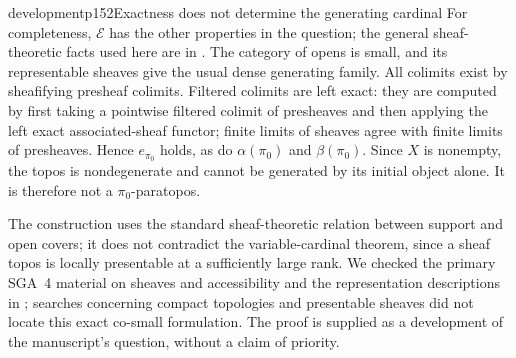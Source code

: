 \begin{dcomment}{development}{p152}{Exactness does not determine the generating cardinal}
For completeness, $\mathcal E$ has the other properties in the question; the general sheaf-theoretic facts used here are in \citet[Expos\'e~II, Theorem~4.1 and Corollary~4.1.1]{SGA4I1972}. The category of opens is small, and its representable sheaves give the usual dense generating family. All colimits exist by sheafifying presheaf colimits. Filtered colimits are left exact: they are computed by first taking a pointwise filtered colimit of presheaves and then applying the left exact associated-sheaf functor; finite limits of sheaves agree with finite limits of presheaves. Hence $e_{\pi_0}$ holds, as do $\alpha(\pi_0)$ and $\beta(\pi_0)$. Since $X$ is nonempty, the topos is nondegenerate and cannot be generated by its initial object alone. It is therefore not a $\pi_0$-paratopos.

The construction uses the standard sheaf-theoretic relation between support and open covers; it does not contradict the variable-cardinal theorem, since a sheaf topos is locally presentable at a sufficiently large rank. We checked the primary SGA~4 material on sheaves and accessibility and the representation descriptions in \citet{AdamekRosicky1994}; searches concerning compact topologies and presentable sheaves did not locate this exact co-small formulation. The proof is supplied as a development of the manuscript's question, without a claim of priority.
\end{dcomment}

